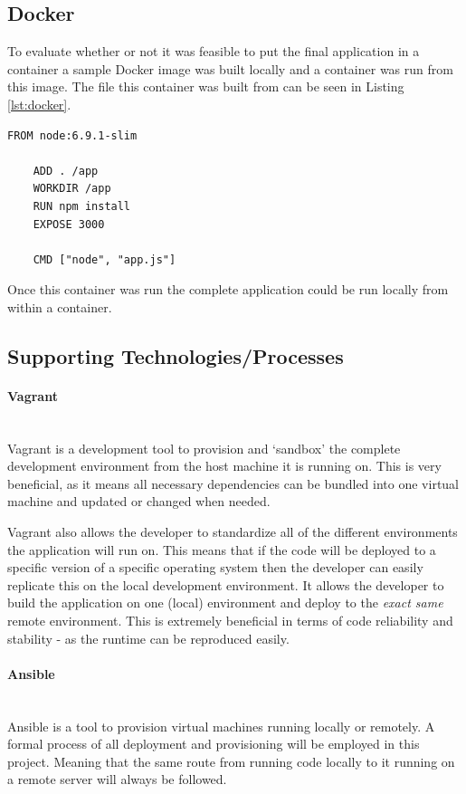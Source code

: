 \subsection{Docker}
To evaluate whether or not it was feasible to put the final application in a container a sample Docker image was built locally and a container was run from this image. The file this container was built from can be seen in Listing \ref{lst:docker}.

\begin{lstlisting}[caption={Creating a Docker Image},label={lst:docker}]
	FROM node:6.9.1-slim

	ADD . /app  
	WORKDIR /app  
	RUN npm install  
	EXPOSE 3000

	CMD ["node", "app.js"]  
\end{lstlisting}

Once this container was run the complete application could be run locally from within a container.

\subsection{Supporting Technologies/Processes}
\label{subs:support}
\paragraph{Vagrant}\mbox{}\\
Vagrant is a development tool to provision and `sandbox' the complete development environment from the host machine it is running on. This is very beneficial, as it means all necessary dependencies can be bundled into one virtual machine and updated or changed when needed. 

Vagrant also allows the developer to standardize all of the different environments the application will run on. This means that if the code will be deployed to a specific version of a specific operating system then the developer can easily replicate this on the local development environment. It allows the developer to build the application on one (local) environment and deploy to the \textit{exact same} remote environment. This is extremely beneficial in terms of code reliability and stability - as the runtime can be reproduced easily.
\paragraph{Ansible}\mbox{}\\
Ansible is a tool to provision virtual machines running locally or remotely. A formal process of all deployment and provisioning will be employed in this project. Meaning that the same route from running code locally to it running on a remote server will always be followed.

